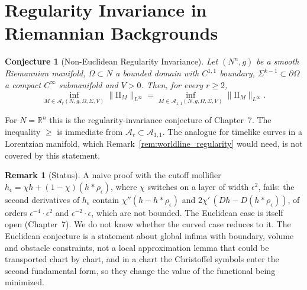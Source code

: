 \documentclass[11pt,reqno]{amsart}
\newtheorem{conjecture}[theorem]{Conjecture}
\theoremstyle{definition}
\newtheorem{remark}[theorem]{Remark}
\providecommand{\R}{\mathbb{R}}
\providecommand{\II}{\mathrm{I\!I}}
\numberwithin{equation}{section}
\providecommand{\II}{\mathrm{II}}
\providecommand{\R}{\mathbb{R}}
\begin{document}
\section{Regularity Invariance in Riemannian Backgrounds}

\begin{conjecture}[Non-Euclidean Regularity Invariance]
\label{thm:noneuclidean_invariance}
Let $(N^n, g)$ be a smooth Riemannian manifold, $\Omega \subset N$ a bounded domain with $C^{1,1}$ boundary, $\Sigma^{k-1} \subset \partial\Omega$ a compact $C^\infty$ submanifold and $V > 0$. Then, for every $r \ge 2$,
\begin{equation}
\inf_{M \in \mathcal{A}_r(N, g, \Omega, \Sigma, V)} \|\II_M\|_{L^\infty} = \inf_{M \in \mathcal{A}_{1,1}(N, g, \Omega, \Sigma, V)} \|\II_M\|_{L^\infty}.
\end{equation}
\end{conjecture}

For $N = \R^n$ this is the regularity-invariance conjecture of Chapter~7. The inequality $\ge$ is immediate from $\mathcal{A}_r \subset \mathcal{A}_{1,1}$. The analogue for timelike curves in a Lorentzian manifold, which Remark~\ref{rem:worldline_regularity} would need, is not covered by this statement.

\begin{remark}[Status]
A naive proof with the cutoff mollifier $h_\epsilon = \chi h + (1-\chi)(h * \rho_\epsilon)$, where $\chi$ switches on a layer of width $\epsilon^2$, fails: the second derivatives of $h_\epsilon$ contain $\chi''(h - h*\rho_\epsilon)$ and $2\chi'\,(Dh - D(h*\rho_\epsilon))$, of orders $\epsilon^{-4}\cdot\epsilon^2$ and $\epsilon^{-2}\cdot\epsilon$, which are not bounded. The Euclidean case is itself open (Chapter~7). We do not know whether the curved case reduces to it. The Euclidean conjecture is a statement about global infima with boundary, volume and obstacle constraints, not a local approximation lemma that could be transported chart by chart, and in a chart the Christoffel symbols enter the second fundamental form, so they change the value of the functional being minimized.
\end{remark}


\end{document}
